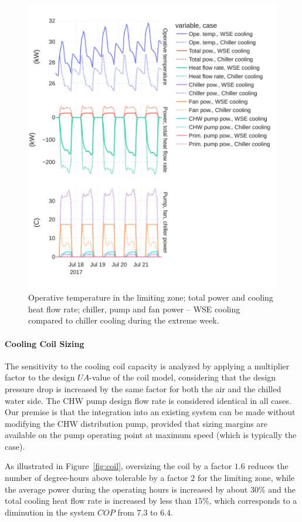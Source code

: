 \begin{figure}[!htbp]
    \centering
    \includegraphics[width=.7\linewidth]{../python_scripts/figures/TOpe.pdf}
    \caption{Operative temperature in the limiting zone; total power and cooling heat flow rate; chiller, pump and fan power -- WSE cooling compared to chiller cooling during the extreme week.}
    \label{fig:tope}
\end{figure}


\paragraph{Cooling Coil Sizing} \label{par:cooling_coil}

The sensitivity to the cooling coil capacity is analyzed by applying a multiplier factor to the design $UA$-value of the coil model,  considering that the design pressure drop is increased by the same factor for both the air and the chilled water side. The CHW pump design flow rate is considered identical in all cases.
Our premise is that the integration into an existing system can be made without modifying the CHW distribution pump, provided that sizing margins are available on the pump operating point at maximum speed (which is typically the case).

As illustrated in Figure~\ref{fig:coil}, oversizing the coil by a factor $1.6$ reduces the number of degree-hours above tolerable by a factor $2$ for the limiting zone, while the average power during the operating hours is increased by about $30\%$ and the total cooling heat flow rate is increased by less than $15\%$, which corresponds to a diminution in the system $COP$ from $7.3$ to $6.4$.

